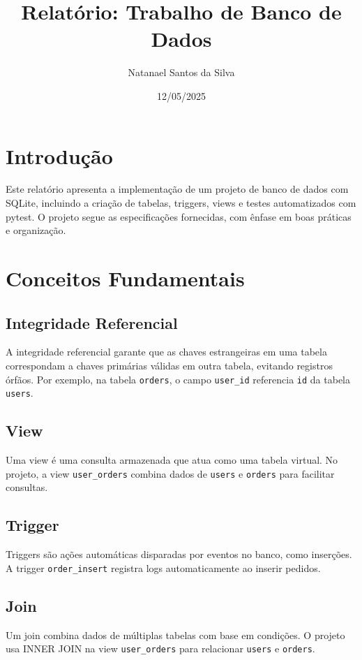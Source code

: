 \documentclass[a4paper,12pt]{article}
\title{Relatório: Trabalho de Banco de Dados}
\author{Natanael Santos da Silva}
\date{12/05/2025}
\begin{document}
\maketitle

\section{Introdução}
Este relatório apresenta a implementação de um projeto de banco de dados com SQLite, incluindo a criação de tabelas, triggers, views e testes automatizados com pytest. O projeto segue as especificações fornecidas, com ênfase em boas práticas e organização.

\section{Conceitos Fundamentais}

\subsection{Integridade Referencial}
A integridade referencial garante que as chaves estrangeiras em uma tabela correspondam a chaves primárias válidas em outra tabela, evitando registros órfãos. Por exemplo, na tabela \texttt{orders}, o campo \texttt{user\_id} referencia \texttt{id} da tabela \texttt{users}.

\subsection{View}
Uma view é uma consulta armazenada que atua como uma tabela virtual. No projeto, a view \texttt{user\_orders} combina dados de \texttt{users} e \texttt{orders} para facilitar consultas.

\subsection{Trigger}
Triggers são ações automáticas disparadas por eventos no banco, como inserções. A trigger \texttt{order\_insert} registra logs automaticamente ao inserir pedidos.

\subsection{Join}
Um join combina dados de múltiplas tabelas com base em condições. O projeto usa INNER JOIN na view \texttt{user\_orders} para relacionar \texttt{users} e \texttt{orders}.
\end{document}
